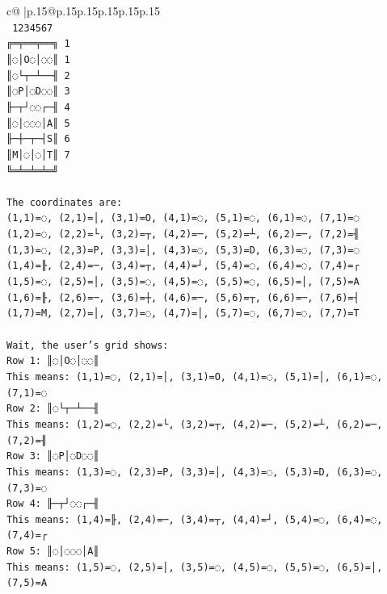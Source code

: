 \documentclass{article}
\begin{document}
{\begin{supertabular}{c@{$\;$}|p{.15\linewidth}@{}p{.15\linewidth}p{.15\linewidth}p{.15\linewidth}p{.15\linewidth}p{.15\linewidth}}
{{{\\ 
\texttt{ 1234567} \\
\texttt{╔═╤══╤══╗ 1} \\
\texttt{║◌│O◌│◌◌║ 1} \\
\texttt{║◌└┬─┴──╢ 2} \\
\texttt{║◌P│◌D◌◌║ 3} \\
\texttt{╟─┬┘◌◌┌─╢ 4} \\
\texttt{║◌│◌◌◌│A║ 5} \\
\texttt{╟─┼─┬─┤S║ 6} \\
\texttt{║M│◌│◌│T║ 7} \\
\texttt{╚═╧═╧═╧═╝} \\
\\ 
\texttt{The coordinates are:} \\
\texttt{(1,1)=◌, (2,1)=│, (3,1)=O, (4,1)=◌, (5,1)=◌, (6,1)=◌, (7,1)=◌} \\
\texttt{(1,2)=◌, (2,2)=└, (3,2)=┬, (4,2)=─, (5,2)=┴, (6,2)=─, (7,2)=╢} \\
\texttt{(1,3)=◌, (2,3)=P, (3,3)=│, (4,3)=◌, (5,3)=D, (6,3)=◌, (7,3)=◌} \\
\texttt{(1,4)=╟, (2,4)=─, (3,4)=┬, (4,4)=┘, (5,4)=◌, (6,4)=◌, (7,4)=┌} \\
\texttt{(1,5)=◌, (2,5)=│, (3,5)=◌, (4,5)=◌, (5,5)=◌, (6,5)=│, (7,5)=A} \\
\texttt{(1,6)=╟, (2,6)=─, (3,6)=┼, (4,6)=─, (5,6)=┬, (6,6)=─, (7,6)=┤} \\
\texttt{(1,7)=M, (2,7)=│, (3,7)=◌, (4,7)=│, (5,7)=◌, (6,7)=◌, (7,7)=T} \\
\\ 
\texttt{Wait, the user's grid shows:} \\
\texttt{Row 1: ║◌│O◌│◌◌║} \\
\texttt{This means: (1,1)=◌, (2,1)=│, (3,1)=O, (4,1)=◌, (5,1)=│, (6,1)=◌, (7,1)=◌} \\
\texttt{Row 2: ║◌└┬─┴──╢} \\
\texttt{This means: (1,2)=◌, (2,2)=└, (3,2)=┬, (4,2)=─, (5,2)=┴, (6,2)=─, (7,2)=╢} \\
\texttt{Row 3: ║◌P│◌D◌◌║} \\
\texttt{This means: (1,3)=◌, (2,3)=P, (3,3)=│, (4,3)=◌, (5,3)=D, (6,3)=◌, (7,3)=◌} \\
\texttt{Row 4: ╟─┬┘◌◌┌─╢} \\
\texttt{This means: (1,4)=╟, (2,4)=─, (3,4)=┬, (4,4)=┘, (5,4)=◌, (6,4)=◌, (7,4)=┌} \\
\texttt{Row 5: ║◌│◌◌◌│A║} \\
\texttt{This means: (1,5)=◌, (2,5)=│, (3,5)=◌, (4,5)=◌, (5,5)=◌, (6,5)=│, (7,5)=A} \\
}}}
\end{supertabular}}
\end{document}
